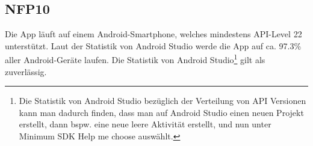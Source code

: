 \subsection*{NFP10}
Die App läuft auf einem \Gls{Android}-\Gls{Smartphone}, welches mindestens \Gls{API-Level} 22 unterstützt. Laut der Statistik von Android Studio werde die App auf ca. 97.3\% aller \Gls{Android}-Geräte laufen. Die Statistik von Android Studio\footnote{Die Statistik von Android Studio bezüglich der Verteilung von \Gls{API} Versionen kann man dadurch finden, dass man auf Android Studio einen neuen Projekt erstellt, dann bspw. eine neue leere Aktivität erstellt, und nun unter Minimum SDK \dq Help me choose\dq{} auswählt.} gilt als zuverlässig.